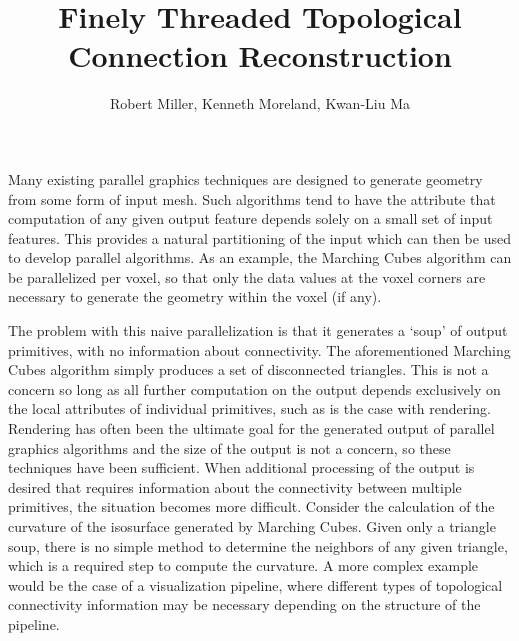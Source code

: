 \documentclass[review,journal]{vgtc}         %
\title{Finely Threaded Topological Connection Reconstruction}
\author{Robert Miller, Kenneth Moreland, Kwan-Liu Ma}
\begin{document}


\maketitle

Many existing parallel graphics techniques are designed to generate geometry from
some form of input mesh. Such algorithms tend to have the attribute that
computation of any given output feature depends solely on a small set
of input features. This provides a natural partitioning of the input
which can then be used to develop parallel algorithms. As an example,
the Marching Cubes \cite{Lorensen1987} algorithm can be parallelized per voxel, so that only
the data values at the voxel corners are necessary to generate the geometry
within the voxel (if any).

The problem with this naive parallelization is that it generates a
`soup' of output primitives, with no information about connectivity.
The aforementioned Marching Cubes algorithm simply produces a set of disconnected triangles.
This is not a concern so long as all further computation on the output
depends exclusively on the local attributes of individual primitives, such as is
the case with rendering. Rendering has often been the ultimate goal for the
generated output of parallel graphics algorithms and the size of the output is not a concern, so these techniques have been sufficient. When
additional processing of the output is desired that requires information about the connectivity 
between multiple primitives, the situation becomes more difficult. Consider the calculation of 
the curvature of the isosurface generated by Marching Cubes.
Given only a triangle soup, there is no simple method to determine the neighbors of any given triangle, which is a required step to 
compute the curvature. A more complex example would be the case of a visualization pipeline,
where different types of topological connectivity information may be necessary depending
on the structure of the pipeline.
\end{document}
